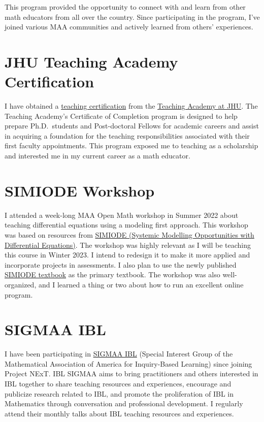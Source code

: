 \documentclass[
]{report}
\begin{document}
This program provided the opportunity to connect with and learn from other math educators from all over the country.
Since participating in the program, I've joined various MAA communities and actively learned from others' experiences.

\hypertarget{jhu-teaching-academy-certification}{%
\section{JHU Teaching Academy Certification}\label{jhu-teaching-academy-certification}}

I have obtained a \href{https://ctei.jhu.edu/teaching-academy/coc}{teaching certification} from the
\href{https://ctei.jhu.edu/teaching-academy}{Teaching Academy at JHU}.
The Teaching Academy's Certificate of Completion program is designed to help prepare Ph.D.~students and Post-doctoral Fellows for academic careers and assist in acquiring a foundation for the teaching responsibilities associated with their first faculty appointments. This program exposed me to teaching as a scholarship and interested me in my current career as a math educator.

\hypertarget{simiode-workshop}{%
\section{SIMIODE Workshop}\label{simiode-workshop}}

I attended a week-long MAA Open Math workshop in Summer 2022 about teaching differential equations using a modeling first approach.
This workshop was based on resources from \href{https://qubeshub.org/community/groups/simiode}{SIMIODE (Systemic Modelling Opportunities with Differential Equations)}. The workshop was highly relevant as I will be teaching this course in Winter 2023. I intend to redesign it to make it more applied and incorporate projects in assessments. I also plan to use the newly published \href{https://qubeshub.org/community/groups/simiode/textbook}{SIMIODE textbook} as the primary textbook.
The workshop was also well-organized, and I learned a thing or two about how to run an excellent online program.

\hypertarget{sigmaa-ibl}{%
\section{SIGMAA IBL}\label{sigmaa-ibl}}

I have been participating in \href{http://sigmaa.maa.org/ibl/}{SIGMAA IBL} (Special Interest Group of the Mathematical Association of America for Inquiry-Based Learning) since joining Project NExT.
IBL SIGMAA aims to bring practitioners and others interested in IBL together to share teaching resources and experiences, encourage and publicize research related to IBL, and promote the proliferation of IBL in Mathematics through conversation and professional development.
I regularly attend their monthly talks about IBL teaching resources and experiences.
\end{document}
